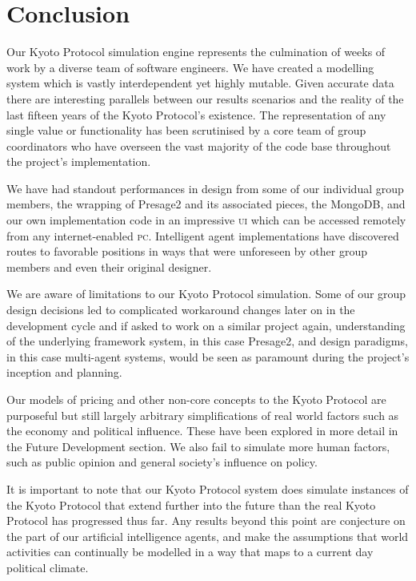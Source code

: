 \section{Conclusion}

Our Kyoto Protocol simulation engine represents the culmination of weeks of work by a diverse team of software engineers. We have created a modelling system which is vastly interdependent yet highly mutable. Given accurate data there are interesting parallels between our results scenarios and the reality of the last fifteen years of the Kyoto Protocol's existence. The representation of any single value or functionality has been scrutinised by a core team of group coordinators who have overseen the vast majority of the code base throughout the project's implementation.

We have had standout performances in design from some of our individual group members, the wrapping of Presage2 and its associated pieces, the MongoDB, and our own implementation code in an impressive \textsc{ui} which can be accessed remotely from any internet-enabled \textsc{pc}. Intelligent agent implementations have discovered routes to favorable positions in ways that were unforeseen by other group members and even their original designer.

We are aware of limitations to our Kyoto Protocol simulation. Some of our group design decisions led to complicated workaround changes later on in the development cycle and if asked to work on a similar project again, understanding of the underlying framework system, in this case Presage2, and design paradigms, in this case multi-agent systems, would be seen as paramount during the project's inception and planning.

Our models of pricing and other non-core concepts to the Kyoto Protocol are purposeful but still largely arbitrary simplifications of real world factors such as the economy and political influence. These have been explored in more detail in the Future Development section. We also fail to simulate more human factors, such as public opinion and general society's influence on policy.

It is important to note that our Kyoto Protocol system does simulate instances of the Kyoto Protocol that extend further into the future than the real Kyoto Protocol has progressed thus far. Any results beyond this point are conjecture on the part of our artificial intelligence agents, and make the assumptions that world activities can continually be modelled in a way that maps to a current day political climate.

